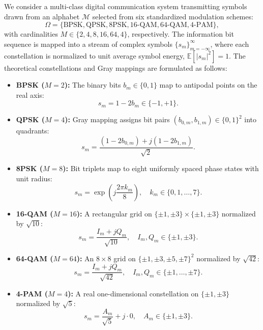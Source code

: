 We consider a multi-class digital communication system transmitting symbols drawn from an alphabet $\mathcal{M}$ selected from six standardized modulation schemes:
\begin{equation}
\Omega = \{\text{BPSK}, \text{QPSK}, \text{8PSK}, \text{16-QAM}, \text{64-QAM}, \text{4-PAM}\},
\end{equation}
with cardinalities $M \in \{2, 4, 8, 16, 64, 4\}$, respectively. The information bit sequence is mapped into a stream of complex symbols $\{s_m\}_{m=-\infty}^{\infty}$, where each constellation is normalized to unit average symbol energy, $\mathbb{E}[|s_m|^2] = 1$. The theoretical constellations and Gray mappings are formulated as follows:
\begin{itemize}
    \item \textbf{BPSK ($M=2$):} The binary bits $b_m \in \{0, 1\}$ map to antipodal points on the real axis:
    \begin{equation}
    s_m = 1 - 2b_m \in \{-1, +1\}.
    \end{equation}
    \item \textbf{QPSK ($M=4$):} Gray mapping assigns bit pairs $(b_{0,m}, b_{1,m}) \in \{0, 1\}^2$ into quadrants:
    \begin{equation}
    s_m = \frac{(1 - 2b_{0,m}) + j(1 - 2b_{1,m})}{\sqrt{2}}.
    \end{equation}
    \item \textbf{8PSK ($M=8$):} Bit triplets map to eight uniformly spaced phase states with unit radius:
    \begin{equation}
    s_m = \exp\left(j \frac{2\pi k_m}{8}\right), \quad k_m \in \{0, 1, \dots, 7\}.
    \end{equation}
    \item \textbf{16-QAM ($M=16$):} A rectangular grid on $\{\pm 1, \pm 3\} \times \{\pm 1, \pm 3\}$ normalized by $\sqrt{10}$:
    \begin{equation}
    s_m = \frac{I_m + j Q_m}{\sqrt{10}}, \quad I_m, Q_m \in \{\pm 1, \pm 3\}.
    \end{equation}
    \item \textbf{64-QAM ($M=64$):} An $8 \times 8$ grid on $\{\pm 1, \pm 3, \pm 5, \pm 7\}^2$ normalized by $\sqrt{42}$:
    \begin{equation}
    s_m = \frac{I_m + j Q_m}{\sqrt{42}}, \quad I_m, Q_m \in \{\pm 1, \dots, \pm 7\}.
    \end{equation}
    \item \textbf{4-PAM ($M=4$):} A real one-dimensional constellation on $\{\pm 1, \pm 3\}$ normalized by $\sqrt{5}$:
    \begin{equation}
    s_m = \frac{A_m}{\sqrt{5}} + j \cdot 0, \quad A_m \in \{\pm 1, \pm 3\}.
    \end{equation}
\end{itemize}

